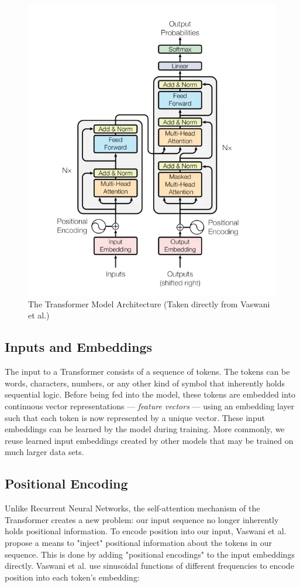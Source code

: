 \documentclass[../main.tex]{subfiles}
\begin{document}
\begin{figure}[hp]
    \centering
    \includegraphics[width=1\textwidth]{imgs/transformer.png}
    \caption{The Transformer Model Architecture (Taken directly from Vaswani et al.)}
    \label{fig:fig1}
\end{figure}

\subsection{Inputs and Embeddings}
The input to a Transformer consists of a sequence of tokens. The tokens can be words, characters, numbers, or any other kind of symbol that inherently holds sequential logic. Before being fed into the model, these tokens are embedded into continuous vector representations — \textit{feature vectors} — using an embedding layer such that each token is now represented by a unique vector. These input embeddings can be learned by the model during training. More commonly, we reuse learned input embeddings created by other models that may be trained on much larger data sets. 

\subsection{Positional Encoding}
Unlike Recurrent Neural Networks, the self-attention mechanism of the Transformer creates a new problem: our input sequence no longer inherently holds positional information. To encode position into our input, Vaswani et al. propose a means to "inject" positional information about the tokens in our sequence. This is done by adding "positional encodings" to the input embeddings directly. Vaswani et al. use sinusoidal functions of different frequencies to encode position into each token's embedding:
\end{document}
